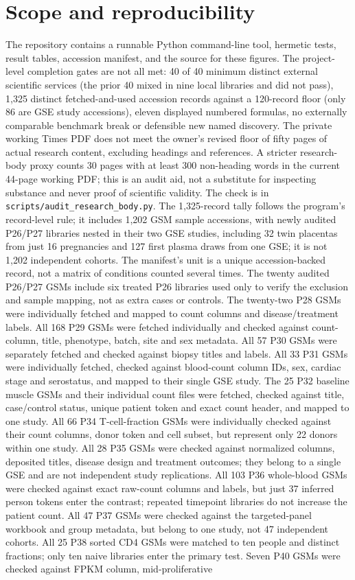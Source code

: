 \documentclass[11pt,a4paper]{article}
\begin{document}
\section{Scope and reproducibility}
The repository contains a runnable Python command-line tool, hermetic tests, result tables, accession manifest, and the source for these figures. The project-level completion gates are not all met: 40 of 40 minimum distinct external scientific services (the prior 40 mixed in nine local libraries and did not pass), 1,325 distinct fetched-and-used accession records against a 120-record floor (only 86 are GSE study accessions), eleven displayed numbered formulas, no externally comparable benchmark break or defensible new named discovery. The private working Times PDF does not meet the owner's revised floor of fifty pages of actual research content, excluding headings and references. A stricter research-body proxy counts 30 pages with at least 300 non-heading words in the current 44-page working PDF; this is an audit aid, not a substitute for inspecting substance and never proof of scientific validity. The check is in \texttt{scripts/audit\_research\_body.py}. The 1,325-record tally follows the program's record-level rule; it includes 1,202 GSM sample accessions, with newly audited P26/P27 libraries nested in their two GSE studies, including 32 twin placentas from just 16 pregnancies and 127 first plasma draws from one GSE; it is not 1,202 independent cohorts. The manifest's unit is a unique accession-backed record, not a matrix of conditions counted several times. The twenty audited P26/P27 GSMs include six treated P26 libraries used only to verify the exclusion and sample mapping, not as extra cases or controls. The twenty-two P28 GSMs were individually fetched and mapped to count columns and disease/treatment labels. All 168 P29 GSMs were fetched individually and checked against count-column, title, phenotype, batch, site and sex metadata. All 57 P30 GSMs were separately fetched and checked against biopsy titles and labels. All 33 P31 GSMs were individually fetched, checked against blood-count column IDs, sex, cardiac stage and serostatus, and mapped to their single GSE study. The 25 P32 baseline muscle GSMs and their individual count files were fetched, checked against title, case/control status, unique patient token and exact count header, and mapped to one study. All 66 P34 T-cell-fraction GSMs were individually checked against their count columns, donor token and cell subset, but represent only 22 donors within one study. All 28 P35 GSMs were checked against normalized columns, deposited titles, disease design and treatment outcomes; they belong to a single GSE and are not independent study replications. All 103 P36 whole-blood GSMs were checked against exact raw-count columns and labels, but just 37 inferred person tokens enter the contrast; repeated timepoint libraries do not increase the patient count. All 47 P37 GSMs were checked against the targeted-panel workbook and group metadata, but belong to one study, not 47 independent cohorts. All 25 P38 sorted CD4 GSMs were matched to ten people and distinct fractions; only ten naive libraries enter the primary test. Seven P40 GSMs were checked against FPKM column, mid-proliferative 
\end{document}
